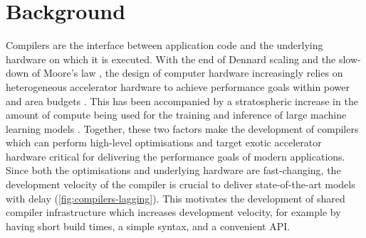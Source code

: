 \chapter{Background}
\label{chap:background}

%

Compilers are the interface between application code and the underlying hardware on which it is executed.
With the end of Dennard scaling and the slow-down of Moore's law \cite{esmaeilzadehDarkSiliconEnd2012}, the design of computer hardware increasingly relies on heterogeneous accelerator hardware to achieve performance goals within power and area budgets \cite{fuchsAcceleratorWallLimits2019}.
This has been accompanied by a stratospheric increase in the amount of compute being used for the training and inference of large machine learning models \cite{desislavovTrendsAIInference2023}.
Together, these two factors make the development of compilers which can perform high-level optimisations and target exotic accelerator hardware critical for delivering the performance goals of modern applications.
Since both the optimisations and underlying hardware are fast-changing, the development velocity of the compiler is crucial to deliver state-of-the-art models with delay (\autoref{fig:compilers-lagging}).
This motivates the development of shared compiler infrastructure which increases development velocity, for example by having short build times, a simple syntax, and a convenient API.

